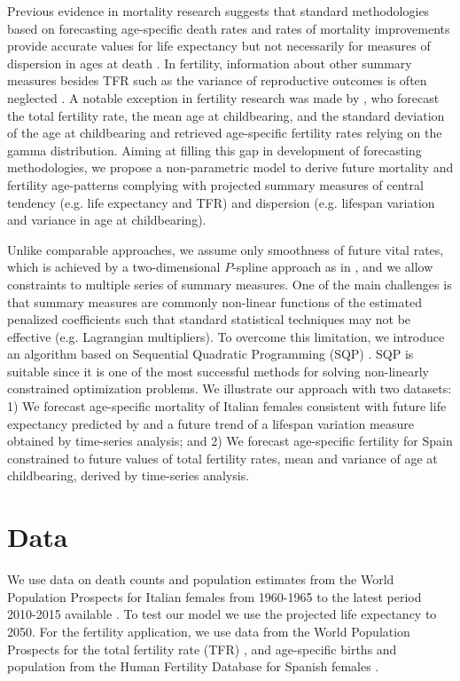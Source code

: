 \documentclass[12pt,a4paper,twoside]{article}
\begin{document}
Previous evidence in mortality research suggests that standard methodologies based on forecasting age-specific death rates and rates of mortality improvements provide accurate values for life expectancy but not necessarily for measures of dispersion in ages at death \citep{bohk2017lifespan}. In fertility, information about other summary measures besides TFR such as the variance of reproductive outcomes is often neglected \citep{hruschka2016does}. A notable exception in fertility research was made by \citet{thompson1989multivariate}, who forecast the total fertility rate, the mean age at childbearing, and the standard deviation of the age at childbearing and retrieved age-specific fertility rates relying on the gamma distribution. Aiming at filling this gap in development of forecasting methodologies, we propose a non-parametric model to derive future mortality and fertility age-patterns complying with projected summary measures of central tendency (e.g. life expectancy and TFR) and dispersion (e.g. lifespan variation and variance in age at childbearing). 

Unlike comparable approaches, we assume only smoothness of future vital rates, which is achieved by a two-dimensional $P$-spline approach as in \citet{currie2004smoothing}, and we allow constraints to multiple series of summary measures. One of the main challenges is that summary measures are commonly non-linear functions of the estimated penalized coefficients such that standard statistical techniques may not be effective (e.g. Lagrangian multipliers). To overcome this limitation, we introduce an algorithm based on Sequential Quadratic Programming (SQP) \citep{nocedal2006sequential}. SQP is suitable since it is one of the most successful methods for solving non-linearly constrained optimization problems. We illustrate our approach with two datasets: 1) We forecast age-specific mortality of Italian females consistent with future life expectancy predicted by \citet{UN2019} and a future trend of a lifespan variation measure obtained by time-series analysis; and 2) We forecast age-specific fertility for Spain constrained to future values of total fertility rates, mean and variance of age at childbearing, derived by time-series analysis.

\section{Data}

We use data on death counts and population estimates from the World Population Prospects for Italian females from 1960-1965 to the latest period 2010-2015 available \citep{UN2019}. To test our model we use the projected life expectancy to 2050. For the fertility application, we use data from the World Population Prospects for the total fertility rate (TFR) \citep{UN2019}, and age-specific births and population from the Human Fertility Database for Spanish females \citep{HFD}.
\end{document}
